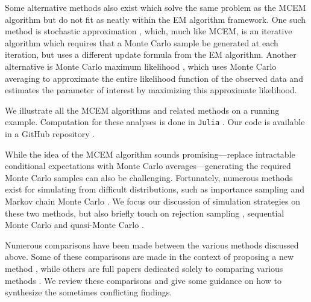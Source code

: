 \documentclass[ss]{imsart}
\theoremstyle{plain}
\theoremstyle{definition}
\theoremstyle{remark}
\begin{document}
Some alternative methods also exist which solve the same problem as the MCEM algorithm but do not fit as neatly within the EM algorithm framework. One such method is stochastic approximation \citep{Gu98I,Del99,Rob51}, which, much like MCEM, is an iterative algorithm which requires that a Monte Carlo sample be generated at each iteration, but uses a different update formula from the EM algorithm. Another alternative is Monte Carlo maximum likelihood \citep{Gey91}, which uses Monte Carlo averaging to approximate the entire likelihood function of the observed data and estimates the parameter of interest by maximizing this approximate likelihood.

We illustrate all the MCEM algorithms and related methods on a running example. Computation for these analyses is done in \texttt{Julia} \citep{Bez17}. Our code is available in a GitHub repository \citep{Rut23I}.



While the idea of the MCEM algorithm sounds promising---replace intractable conditional expectations with Monte Carlo averages---generating the required Monte Carlo samples can also be challenging. Fortunately, numerous methods exist for simulating from difficult distributions, such as importance sampling \citep{Rob04} and Markov chain Monte Carlo \citep{Gel13}. We focus our discussion of simulation strategies on these two methods, but also briefly touch on rejection sampling \citep{Rob04}, sequential Monte Carlo \citep{Del06} and quasi-Monte Carlo \citep{Caf98}.

Numerous comparisons have been made between the various methods discussed above. Some of these comparisons are made in the context of proposing a new method \citep[e.g.,][]{Gu98I,Boo99}, while others are full papers dedicated solely to comparing various methods \citep[e.g.,][]{McC97,Boo01}. We review these comparisons and give some guidance on how to synthesize the sometimes conflicting findings. 
\end{document}
